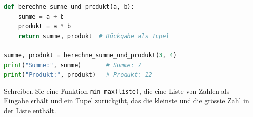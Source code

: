 \begin{myexample}
	\leavevmode
	\begin{lstlisting}[language=Python]
def berechne_summe_und_produkt(a, b):
	summe = a + b
	produkt = a * b
	return summe, produkt  # Rückgabe als Tupel

summe, produkt = berechne_summe_und_produkt(3, 4)
print("Summe:", summe)       # Summe: 7
print("Produkt:", produkt)   # Produkt: 12
\end{lstlisting}
\end{myexample}

\begin{myexercise}

	Schreiben Sie eine Funktion \lstinline|min_max(liste)|, die eine Liste von Zahlen als Eingabe erhält und ein Tupel zurückgibt, das die kleinste und die grösste Zahl in der Liste enthält.

	\begin{myanswer}
		
	\end{myanswer}

\end{myexercise}

